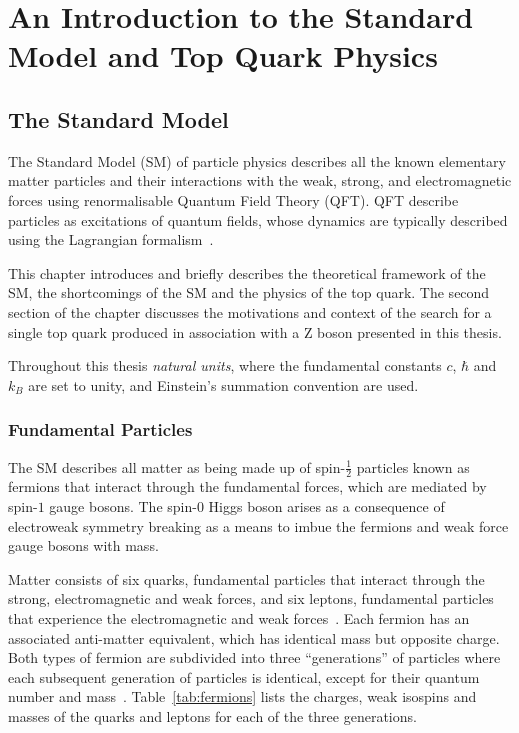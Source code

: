 \chapter{An Introduction to the Standard Model and Top Quark Physics}\label{chapter:theory}
\section{The Standard Model}\label{sec:sm}
The Standard Model (SM) of particle physics describes all the known elementary matter particles and their interactions with the weak, strong, and electromagnetic forces using renormalisable Quantum Field Theory (QFT).
QFT describe particles as excitations of quantum fields, whose dynamics are typically described using the Lagrangian formalism~\cite{LagrangiansSM}.

This chapter introduces and briefly describes the theoretical framework of the SM, the shortcomings of the SM and the physics of the top quark.
The second section of the chapter discusses the motivations and context of the search for a single top quark produced in association with a Z boson presented in this thesis.

Throughout this thesis \emph{natural units}, where the fundamental constants $c$, $\hbar$ and $k_{B}$ are set to unity, and Einstein's summation convention are used.

\subsection{Fundamental Particles}\label{subsec:particles}
The SM describes all matter as being made up of spin-$\frac{1}{2}$ particles known as fermions that interact through the fundamental forces, which are mediated by spin-$1$ gauge bosons.
The spin-$0$ Higgs boson arises as a consequence of electroweak symmetry breaking as a means to imbue the fermions and weak force gauge bosons with mass.

Matter consists of six quarks, fundamental particles that interact through the strong, electromagnetic and weak forces, and six leptons, fundamental particles that experience the electromagnetic and weak forces~\cite{LagrangiansSM}.
Each fermion has an associated anti-matter equivalent, which has identical mass but opposite charge.
Both types of fermion are subdivided into three ``generations'' of particles where each subsequent generation of particles is identical, except for their quantum number and mass~\cite{ElectroweakStrong}.
Table~\ref{tab:fermions} lists the charges, weak isospins and masses of the quarks and leptons for each of the three generations.

